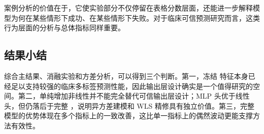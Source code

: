 案例分析的价值在于，它使实验部分不仅停留在表格分数层面，还能进一步解释模型为何在某些情形下成功、在某些情形下失败。对于临床可信预测研究而言，这类行为层面的分析与总体指标同样重要。

\subsection{结果小结}
综合主结果、消融实验和方差分析，可以得到三个判断。第一，冻结 \encoder{} 特征本身已经足以支持较强的临床多标签预测性能，因此输出层设计确实是一个值得研究的空间。第二，单纯增加非线性并不能完全替代可信输出层设计；MLP 头优于线性头，但仍落后于完整 \method{}，说明异方差建模和 WLS 精修具有独立价值。第三，完整模型的优势体现在多个指标上的一致改善，这比单一指标上的偶然波动更能支撑方法有效性。
